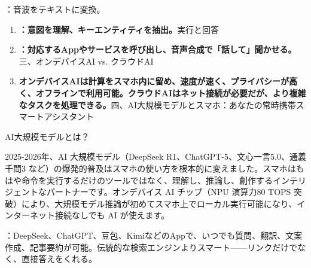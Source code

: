 


：音波をテキストに変換。


\begin{enumerate}
  \item \textbf{：意図を理解、キーエンティティを抽出。}実行と回答
  \item \textbf{：対応するAppやサービスを呼び出し、音声合成で「話して」聞かせる。}三、オンデバイスAI vs. クラウドAI
  \item \textbf{オンデバイスAIは計算をスマホ内に留め、速度が速く、プライバシーが高く、オフラインで利用可能。クラウドAIはネット接続が必要だが、より複雑なタスクを処理できる。}四、AI大規模モデルとスマホ：あなたの常時携帯スマートアシスタント
\end{enumerate}


AI大規模モデルとは？


2025-2026年、AI 大規模モデル（DeepSeek R1、ChatGPT-5、文心一言5.0、通義千問3 など）の爆発的普及はスマホの使い方を根本的に変えました。スマホはもはや命令を実行するだけのツールではなく、理解し、推論し、創作するインテリジェントなパートナーです。オンデバイス AI チップ（NPU 演算力80 TOPS 突破）により、大規模モデル推論が初めてスマホ上でローカル実行可能になり、インターネット接続なしでも AI が使えます。


：DeepSeek、ChatGPT、豆包、KimiなどのAppで、いつでも質問、翻訳、文案作成、記事要約が可能。伝統的な検索エンジンよりスマート——リンクだけでなく、直接答えをくれる。


